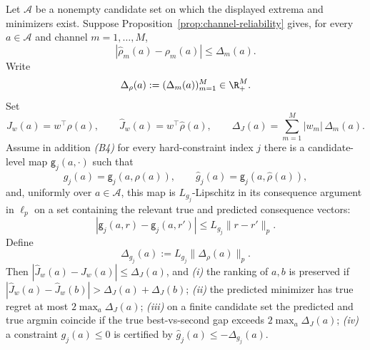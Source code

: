 \begin{theorem}
\label{thm:decision-margins}
Let $\mathcal A$ be a nonempty candidate set on which the displayed extrema
and minimizers exist.  Suppose Proposition~\ref{prop:channel-reliability}
gives, for every $a\in\mathcal A$ and channel $m=1,\ldots,M$,
\begin{equation}
  |\hat\rho_m(a)-\rho_m(a)|\leq\Delta_m(a).
  \label{eq:D2-channel-envelope}
\end{equation}
Write
\[
  \Delta_\rho(a):=(\Delta_m(a))_{m=1}^{M}\in\R_+^M.
\]
Set
\[
  J_w(a)=w^\top\rho(a),
  \qquad
  \hat J_w(a)=w^\top\hat\rho(a),
  \qquad
  \Delta_J(a)=\sum_{m=1}^{M}|w_m|\,\Delta_m(a).
\]
Assume in addition
\emph{(B4)} for every hard-constraint index $j$ there is a candidate-level
map $\mathsf g_j(a,\cdot)$ such that
\[
  g_j(a)=\mathsf g_j(a,\rho(a)),
  \qquad
  \hat g_j(a)=\mathsf g_j(a,\hat\rho(a)),
\]
and, uniformly over $a\in\mathcal A$, this map is $L_{g_j}$-Lipschitz in its
consequence argument in $\ell_p$ on a set containing the relevant true and
predicted consequence vectors:
\begin{equation}
  |\mathsf g_j(a,r)-\mathsf g_j(a,r')|
  \leq L_{g_j}\|r-r'\|_p.
  \label{eq:D2-B4-constraint-lipschitz}
\end{equation}
Define
\begin{equation}
  \Delta_{g_j}(a):=L_{g_j}\|\Delta_\rho(a)\|_p.
  \label{eq:D2-constraint-envelope}
\end{equation}
Then $|\hat J_w(a)-J_w(a)|\leq\Delta_J(a)$, and
\emph{(i)} the ranking of $a,b$ is preserved if
$|\hat J_w(a)-\hat J_w(b)|>\Delta_J(a)+\Delta_J(b)$;
\emph{(ii)} the predicted minimizer has true regret at most
$2\max_a\Delta_J(a)$;
\emph{(iii)} on a finite candidate set the predicted and true argmin coincide
if the true best-vs-second gap exceeds $2\max_a\Delta_J(a)$;
\emph{(iv)} a constraint $g_j(a)\leq0$ is certified by
$\hat g_j(a)\leq-\Delta_{g_j}(a)$.
\end{theorem}

